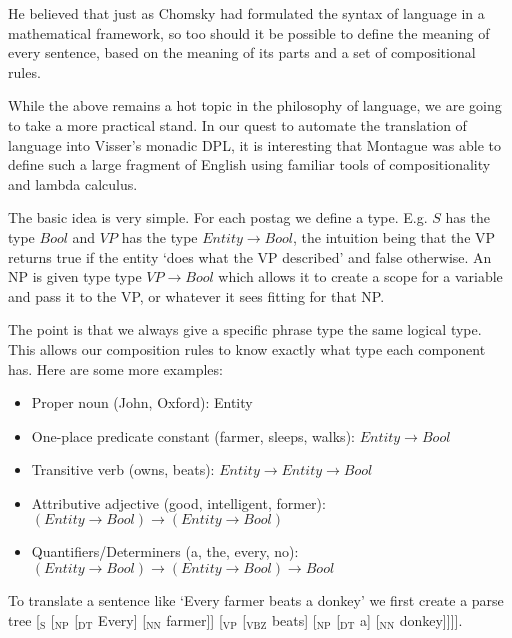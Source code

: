\documentclass[12pt]{article}
\begin{document}
He believed that just as Chomsky had formulated the syntax of language in a mathematical framework, so too should it be possible to define the meaning of every sentence, based on the meaning of its parts and a set of compositional rules.

While the above remains a hot topic in the philosophy of language, we are going to take a more practical stand. In our quest to automate the translation of language into Visser's monadic DPL, it is interesting that Montague was able to define such a large fragment of English using familiar tools of compositionality and lambda calculus.

The basic idea is very simple. For each postag we define a type. E.g. $S$ has the type $Bool$ and $VP$ has the type $Entity \rightarrow Bool$, the intuition being that the VP returns true if the entity `does what the VP described' and false otherwise. An NP is given type type $VP \rightarrow Bool$ which allows it to create a scope for a variable and pass it to the VP, or whatever it sees fitting for that NP.

The point is that we always give a specific phrase type the same logical type. This allows our composition rules to know exactly what type each component has. Here are some more examples:
\begin{itemize}
\item Proper noun (John, Oxford): Entity
\item One-place predicate constant (farmer, sleeps, walks): $Entity \rightarrow Bool$
\item Transitive verb (owns, beats): $Entity \rightarrow Entity \rightarrow Bool$
\item Attributive adjective (good, intelligent, former): $(Entity \rightarrow Bool) \rightarrow (Entity \rightarrow Bool)$
\item Quantifiers/Determiners (a, the, every, no): $(Entity \rightarrow Bool) \rightarrow (Entity \rightarrow Bool) \rightarrow Bool$
\end{itemize}

To translate a sentence like `Every farmer beats a donkey' we first create a parse tree [$_\text{S}$ [$_\text{NP}$ [$_\text{DT}$ Every] [$_\text{NN}$ farmer]] [$_\text{VP}$ [$_\text{VBZ}$ beats] [$_\text{NP}$ [$_\text{DT}$ a] [$_\text{NN}$ donkey]]]].
\end{document}

